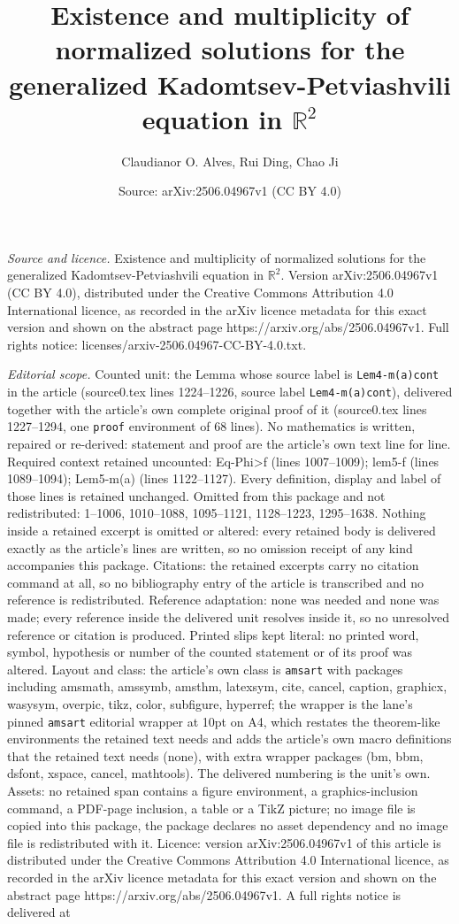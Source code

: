 \documentclass[10pt,a4paper]{amsart}
\title[Existence and multiplicity of normalized solutions for the g]{Existence and multiplicity of normalized solutions for the generalized Kadomtsev-Petviashvili equation in $\mathbb{R}^2$}
\author{Claudianor O. Alves, Rui Ding, Chao Ji}
\date{Source: arXiv:2506.04967v1 (CC BY 4.0)}
\begin{document}
\maketitle

\noindent\emph{Source and licence.} Existence and multiplicity of normalized solutions for the generalized Kadomtsev-Petviashvili equation in $\mathbb{R}^2$. Version arXiv:2506.04967v1 (CC BY 4.0), distributed under the Creative Commons Attribution 4.0 International licence, as recorded in the arXiv licence metadata for this exact version and shown on the abstract page https://arxiv.org/abs/2506.04967v1. Full rights notice: licenses/arxiv-2506.04967-CC-BY-4.0.txt.\par\smallskip

\noindent\textit{Editorial scope.} Counted unit: the Lemma whose source label is \texttt{Lem4-m(a)cont} in the article (source0.tex lines 1224--1226, source label \texttt{Lem4-m(a)cont}), delivered together with the article's own complete original proof of it (source0.tex lines 1227--1294, one \texttt{proof} environment of 68 lines). No mathematics is written, repaired or re-derived: statement and proof are the article's own text line for line. Required context retained uncounted: Eq-Phi>f (lines 1007--1009); lem5-f (lines 1089--1094); Lem5-m(a) (lines 1122--1127). Every definition, display and label of those lines is retained unchanged. Omitted from this package and not redistributed: 1--1006, 1010--1088, 1095--1121, 1128--1223, 1295--1638. Nothing inside a retained excerpt is omitted or altered: every retained body is delivered exactly as the article's lines are written, so no omission receipt of any kind accompanies this package. Citations: the retained excerpts carry no citation command at all, so no bibliography entry of the article is transcribed and no reference is redistributed. Reference adaptation: none was needed and none was made; every reference inside the delivered unit resolves inside it, so no unresolved reference or citation is produced. Printed slips kept literal: no printed word, symbol, hypothesis or number of the counted statement or of its proof was altered. Layout and class: the article's own class is \texttt{amsart} with packages including amsmath, amssymb, amsthm, latexsym, cite, cancel, caption, graphicx, wasysym, overpic, tikz, color, subfigure, hyperref; the wrapper is the lane's pinned \texttt{amsart} editorial wrapper at 10pt on A4, which restates the theorem-like environments the retained text needs and adds the article's own macro definitions that the retained text needs (none), with extra wrapper packages (bm, bbm, dsfont, xspace, cancel, mathtools). The delivered numbering is the unit's own. Assets: no retained span contains a figure environment, a graphics-inclusion command, a PDF-page inclusion, a table or a TikZ picture; no image file is copied into this package, the package declares no asset dependency and no image file is redistributed with it. Licence: version arXiv:2506.04967v1 of this article is distributed under the Creative Commons Attribution 4.0 International licence, as recorded in the arXiv licence metadata for this exact version and shown on the abstract page https://arxiv.org/abs/2506.04967v1. A full rights notice is delivered at 
\end{document}
